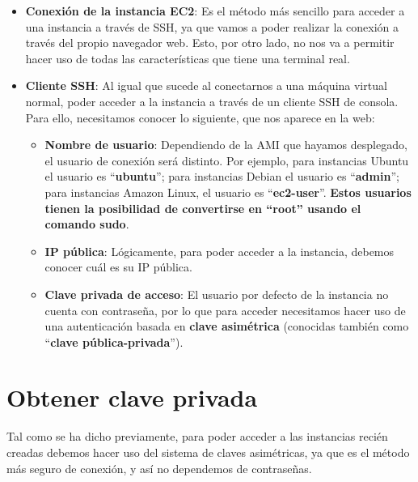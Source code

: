 \begin{itemize}
	\item \textbf{Conexión de la instancia EC2}: Es el método más sencillo para acceder a una instancia a través de SSH, ya que vamos a poder realizar la conexión a través del propio navegador web. Esto, por otro lado, no nos va a permitir hacer uso de todas las características que tiene una terminal real.
	
	\item \textbf{Cliente SSH}: Al igual que sucede al conectarnos a una máquina virtual normal,  poder acceder a la instancia a través de un cliente SSH de consola. Para ello, necesitamos conocer lo siguiente, que nos aparece en la web:
	\begin{itemize}
		\item \textbf{Nombre de usuario}: Dependiendo de la AMI que hayamos desplegado, el usuario de conexión será distinto. Por ejemplo, para instancias Ubuntu el usuario es “\textbf{ubuntu}”; para instancias Debian el usuario es “\textbf{admin}”; para instancias Amazon Linux, el usuario es “\textbf{ec2-user}”. \textbf{Estos usuarios tienen la posibilidad de convertirse en “root” usando el comando sudo}.
		
		
		\item \textbf{IP pública}: Lógicamente, para poder acceder a la instancia, debemos conocer cuál es su IP pública.
		
		\item \textbf{Clave privada de acceso}: El usuario por defecto de la instancia no cuenta con contraseña, por lo que para acceder necesitamos hacer uso de una autenticación basada en \textbf{clave asimétrica} (conocidas también como “\textbf{clave pública-privada}”).
		
		
	\end{itemize}
\end{itemize}


\section{Obtener clave privada}

Tal como se ha dicho previamente, para poder acceder a las instancias recién creadas debemos hacer uso del sistema de claves asimétricas, ya que es el método más seguro de conexión, y así no dependemos de contraseñas.

